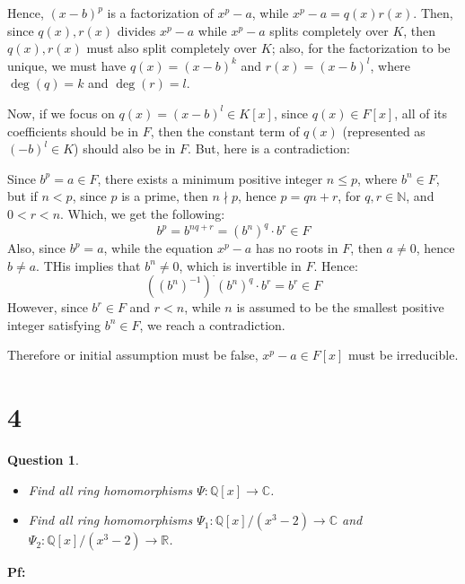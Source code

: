 \documentclass{article}
\newtheorem{question}{Question}
\begin{document}
Hence, $(x-b)^p$ is a factorization of $x^p-a$, while $x^p-a=q(x)r(x)$. Then, since $q(x),r(x)$ divides $x^p-a$ while $x^p-a$ splits completely over $K$, then $q(x),r(x)$ must also split completely over $K$; 
also, for the factorization to be unique, we must have $q(x)=(x-b)^k$ and $r(x)=(x-b)^l$, where $\deg(q)=k$ and $\deg(r)=l$.

\hfil

Now, if we focus on $q(x)=(x-b)^l\in K[x]$, since $q(x)\in F[x]$, all of its coefficients should be in $F$, then the constant term of $q(x)$ (represented as $(-b)^l\in K$) should also be in $F$. But, here is a contradiction:

Since $b^p=a\in F$, there exists a minimum positive integer $n\leq p$, where $b^n\in F$, but if $n<p$, since $p$ is a prime, then $n\nmid p$, hence $p=qn+r$, for $q,r\in \mathbb{N}$, and $0<r<n$.
Which, we get the following:
$$b^p=b^{nq+r}=(b^n)^q\cdot b^r \in F$$
Also, since $b^p=a$, while the equation $x^p-a$ has no roots in $F$, then $a\neq 0$, hence $b\neq a$. THis implies that $b^n \neq 0$, which is invertible in $F$. Hence:
$$((b^n)^{-1})^\cdot(b^n)^q\cdot b^r=b^r\in F$$
However, since $b^r\in F$ and $r<n$, while $n$ is assumed to be the smallest positive integer satisfying $b^n\in F$, we reach a contradiction.

Therefore or initial assumption must be false, $x^p-a\in F[x]$ must be irreducible.



\break

\section*{4}
\begin{myBox}[]{}
    \begin{question}

        \hfil

        \begin{itemize}
            \item[(a)] Find all ring homomorphisms $\Psi:\mathbb{Q}[x]\rightarrow \mathbb{C}$.
            \item[(b)] Find all ring homomorphisms $\Psi_1:\mathbb{Q}[x]/(x^3-2)\rightarrow\mathbb{C}$ and $\Psi_2:\mathbb{Q}[x]/(x^3-2)\rightarrow\mathbb{R}$.
        \end{itemize}
    \end{question}
\end{myBox}

\textbf{Pf:}
\end{document}
